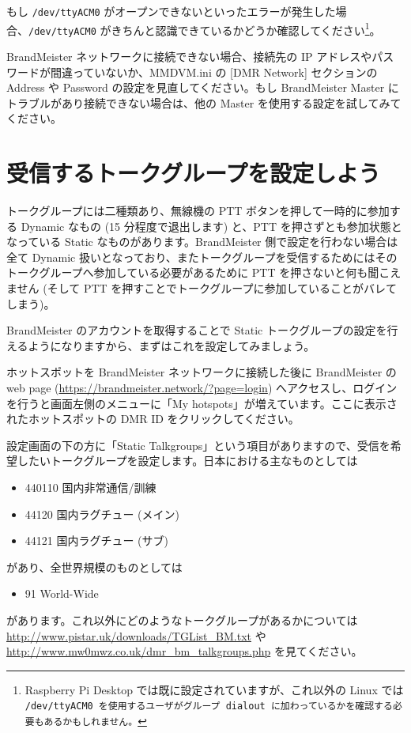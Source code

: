\documentclass[a4j,oneside]{ujbook}
\begin{document}
もし \verb+/dev/ttyACM0+ がオープンできないといったエラーが発生した場合、\verb+/dev/ttyACM0+ がきちんと認識できているかどうか確認してください\footnote{Raspberry Pi Desktop では既に設定されていますが、これ以外の Linux では \tt{/dev/ttyACM0} を使用するユーザがグループ dialout に加わっているかを確認する必要もあるかもしれません。}。

BrandMeister ネットワークに接続できない場合、接続先の IP アドレスやパスワードが間違っていないか、MMDVM.ini の [DMR Network] セクションの Address や Password の設定を見直してください。もし BrandMeister Master にトラブルがあり接続できない場合は、他の Master を使用する設定を試してみてください。

\section{受信するトークグループを設定しよう}

トークグループには二種類あり、無線機の PTT ボタンを押して一時的に参加する Dynamic なもの (15 分程度で退出します) と、PTT を押さずとも参加状態となっている Static なものがあります。BrandMeister 側で設定を行わない場合は全て Dynamic 扱いとなっており、またトークグループを受信するためにはそのトークグループへ参加している必要があるために PTT を押さないと何も聞こえません (そして PTT を押すことでトークグループに参加していることがバレてしまう)。

BrandMeister のアカウントを取得することで Static トークグループの設定を行えるようになりますから、まずはこれを設定してみましょう。

ホットスポットを BrandMeister ネットワークに接続した後に BrandMeister の web page (\url{https://brandmeister.network/?page=login}) へアクセスし、ログインを行うと画面左側のメニューに「My hotspots」が増えています。ここに表示されたホットスポットの DMR ID をクリックしてください。

設定画面の下の方に「Static Talkgroups」という項目がありますので、受信を希望したいトークグループを設定します。日本における主なものとしては
\begin{itemize}
 \item 440110 国内非常通信/訓練
 \item 44120 国内ラグチュー (メイン)
 \item 44121 国内ラグチュー (サブ)
\end{itemize}
があり、全世界規模のものとしては
\begin{itemize}
 \item 91 World-Wide
\end{itemize}
があります。これ以外にどのようなトークグループがあるかについては \url{http://www.pistar.uk/downloads/TGList_BM.txt} や \url{http://www.mw0mwz.co.uk/dmr_bm_talkgroups.php} を見てください。
\end{document}
